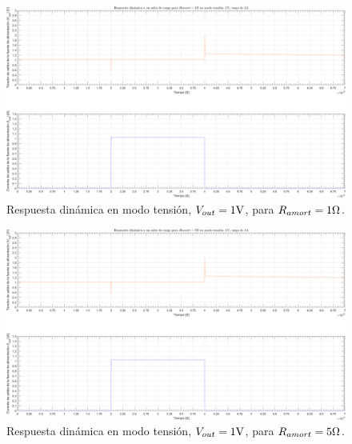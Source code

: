 \clearpage

\begin{figure}[H] %
\begin{center}
\includegraphics[width=1.1 \textwidth, angle=90]{./img/plots/dynamic/power_supply_RAMORT_1_STEP_Modo2.png}
\caption{\label{fig:fig_power_supply_RAMORT_STEP_1_Modo2}\footnotesize{Respuesta dinámica en modo tensión, $V_{out} = 1 \si[per-mode=symbol]{\volt}$, para $R_{amort} = 1 \si[per-mode=symbol]{\ohm} $.}}
\end{center}
\end{figure}

\clearpage

\begin{figure}[H] %
\begin{center}
\includegraphics[width=1.1 \textwidth, angle=90]{./img/plots/dynamic/power_supply_RAMORT_5_STEP_Modo2.png}
\caption{\label{fig:fig_power_supply_RAMORT_STEP_5_Modo2}\footnotesize{Respuesta dinámica en modo tensión, $V_{out} = 1 \si[per-mode=symbol]{\volt}$, para $R_{amort} = 5 \si[per-mode=symbol]{\ohm} $.}}
\end{center}
\end{figure}

\clearpage
